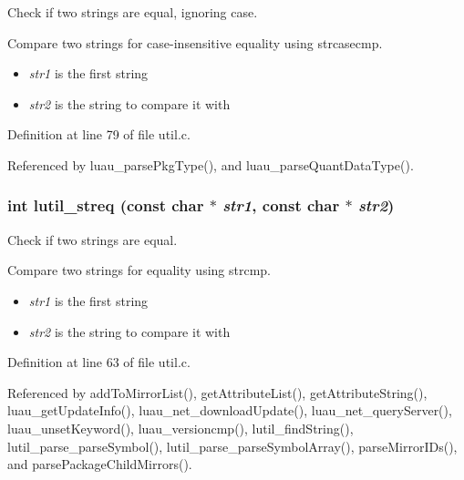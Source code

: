 Check if two strings are equal, ignoring case. 

Compare two strings for case-insensitive equality using strcasecmp.

\begin{itemize}
\item {\em str1\/} is the first string \item {\em str2\/} is the string to compare it with 
\end{itemize}


Definition at line 79 of file util.c.

Referenced by luau\_\-parse\-Pkg\-Type(), and luau\_\-parse\-Quant\-Data\-Type().
\subsubsection{\setlength{\rightskip}{0pt plus 5cm}int lutil\_\-streq (const char $\ast$ {\em str1}, const char $\ast$ {\em str2})\hspace{0.3cm}{\tt  [inline]}}\label{util_8c_a0}


Check if two strings are equal. 

Compare two strings for equality using strcmp.

\begin{itemize}
\item {\em str1\/} is the first string \item {\em str2\/} is the string to compare it with 
\end{itemize}


Definition at line 63 of file util.c.

Referenced by add\-To\-Mirror\-List(), get\-Attribute\-List(), get\-Attribute\-String(), luau\_\-get\-Update\-Info(), luau\_\-net\_\-download\-Update(), luau\_\-net\_\-query\-Server(), luau\_\-unset\-Keyword(), luau\_\-versioncmp(), lutil\_\-find\-String(), lutil\_\-parse\_\-parse\-Symbol(), lutil\_\-parse\_\-parse\-Symbol\-Array(), parse\-Mirror\-IDs(), and parse\-Package\-Child\-Mirrors().
